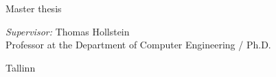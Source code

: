 \begin{titlepage}
	\vspace{2em}
	
	\begin{center}		
		\textsf{Master thesis}
	\end{center}
	
	\vspace{2cm}
	
	\begin{flushright}		
			
			\emph{Supervisor:} \quad Thomas Hollstein \\
			\small{Professor at the Department of Computer Engineering /  Ph.D.}		
	\end{flushright}
	
	\vspace{\fill}
	\begin{center} 
		Tallinn \the\year
	\end{center}	
\end{titlepage}
